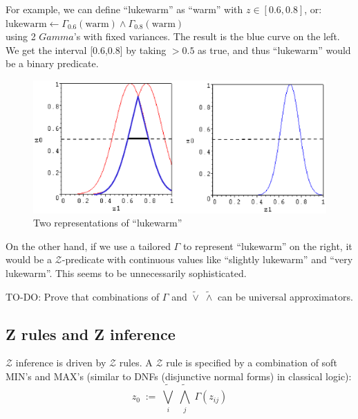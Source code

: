For example, we can define ``lukewarm'' as ``warm'' with $z \in [0.6,0.8]$, or:\\
\hspace*{1cm} $\mbox{lukewarm} \leftarrow \Gamma_{0.6}(\mbox{warm}) \wedge \Gamma_{0.8}(\mbox{warm})$\\
using 2 $Gamma$'s with fixed variances.  The result is the blue curve on the left.  We get the interval [0.6,0.8] by taking $> 0.5$ as true, and thus ``lukewarm'' would be a binary predicate.
\begin{figure}[H]
\centering
\includegraphics[scale=0.7]{Gamma-for-lukewarm.eps}
\caption{Two representations of ``lukewarm''}
\end{figure}
On the other hand, if we use a tailored $\Gamma$ to represent ``lukewarm'' on the right, it would be a $\mathcal{Z}$-predicate with continuous values like ``slightly lukewarm'' and ``very lukewarm''.  This seems to be unnecessarily sophisticated.

TO-DO:  Prove that combinations of $\Gamma$ and $\widetilde{\vee} \; \widetilde{\wedge}$ can be universal approximators.

\subsection{Z rules and Z inference}

$\mathcal{Z}$ inference is driven by $\mathcal{Z}$ rules.  A $\mathcal{Z}$ rule is specified by a combination of soft MIN's and MAX's (similar to DNFs (disjunctive normal forms) in classical logic):
\begin{equation}
z_0 \; := \; \widetilde{\bigvee_i} \; \widetilde{\bigwedge_j} \; \Gamma(z_{ij})
\end{equation}

